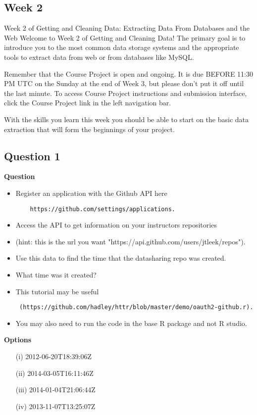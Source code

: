 \documentclass[12pt]{article}
\begin{document}
\newpage
\subsection*{Week 2} 

Week 2 of Getting and Cleaning Data: Extracting Data From Databases and the Web
Welcome to Week 2 of Getting and Cleaning Data! The primary goal is to introduce you to the most common data storage systems and the appropriate tools to extract data from web or from databases like MySQL. 

Remember that the Course Project is open and ongoing. It is due BEFORE 11:30 PM UTC on the Sunday at the end of Week 3, but please don't put it off until the last minute. To access Course Project instructions and submission interface, click the Course Project link in the left navigation bar.  

With the skills you learn this week you should be able to start on the basic data extraction that will form the beginnings of your project. 

\newpage
\subsection*{Question 1}
\textbf{Question}
\begin{itemize}
	\item Register an application with the Github API here 
	\begin{verbatim}
	https://github.com/settings/applications. 
	\end{verbatim}
	\item Access the API to get information on your instructors repositories 
	\item (hint: this is the url you want "https://api.github.com/users/jtleek/repos"). \item Use this data to find the time that the datasharing repo was created. \item What time was it created?
	\item This tutorial may be useful
	\begin{verbatim} (https://github.com/hadley/httr/blob/master/demo/oauth2-github.r).
	\end{verbatim}
	\item You may also need to run the code in the base R package and not R studio.
\end{itemize}

\noindent \textbf{Options} \\
\begin{itemize}
\item[(i)] 2012-06-20T18:39:06Z
\item[(ii)] 2014-03-05T16:11:46Z
\item[(iii)] 2014-01-04T21:06:44Z
\item[(iv)] 2013-11-07T13:25:07Z
\end{itemize}
\end{document}
